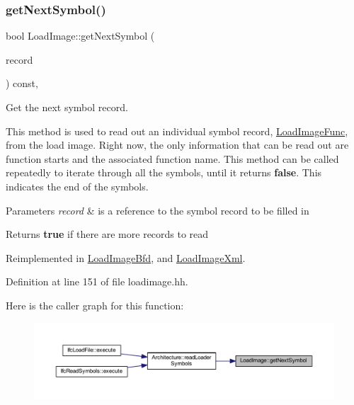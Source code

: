 \subsubsection{\texorpdfstring{getNextSymbol()}{getNextSymbol()}}
{\footnotesize\ttfamily bool Load\+Image\+::get\+Next\+Symbol (\begin{DoxyParamCaption}\item[{\mbox{\hyperlink{struct_load_image_func}{Load\+Image\+Func}} \&}]{record }\end{DoxyParamCaption}) const\hspace{0.3cm}{\ttfamily [inline]}, {\ttfamily [virtual]}}



Get the next symbol record. 

This method is used to read out an individual symbol record, \mbox{\hyperlink{struct_load_image_func}{Load\+Image\+Func}}, from the load image. Right now, the only information that can be read out are function starts and the associated function name. This method can be called repeatedly to iterate through all the symbols, until it returns {\bfseries{false}}. This indicates the end of the symbols. 
\begin{DoxyParams}{Parameters}
{\em record} & is a reference to the symbol record to be filled in \\
\hline
\end{DoxyParams}
\begin{DoxyReturn}{Returns}
{\bfseries{true}} if there are more records to read 
\end{DoxyReturn}


Reimplemented in \mbox{\hyperlink{class_load_image_bfd_a8db5bae4688dfea449ed8c5e9d584904}{Load\+Image\+Bfd}}, and \mbox{\hyperlink{class_load_image_xml_ab0a1e2aee8d5d8925e29662f32fa2060}{Load\+Image\+Xml}}.



Definition at line 151 of file loadimage.\+hh.

Here is the caller graph for this function\+:
\nopagebreak
\begin{figure}[H]
\begin{center}
\leavevmode
\includegraphics[width=350pt]{class_load_image_af4a887cf44c719c576bb05605a4c5c7e_icgraph}
\end{center}
\end{figure}
\mbox{\label{class_load_image_a31dba7f0f819c97e68f868cc623e4054}} 
